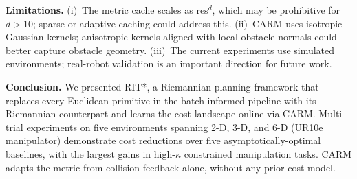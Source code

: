 \documentclass[journal]{IEEEtran}
\begin{document}
\textbf{Limitations.}
(i)~The metric cache scales as $\mathrm{res}^d$, which may be
prohibitive for $d > 10$; sparse or adaptive caching could address
this.
(ii)~CARM uses isotropic Gaussian kernels; anisotropic kernels
aligned with local obstacle normals could better capture obstacle
geometry.
(iii)~The current experiments use simulated environments; real-robot
validation is an important direction for future work.

\textbf{Conclusion.}
We presented RIT*, a Riemannian planning framework that replaces
every Euclidean primitive in the batch-informed pipeline with its
Riemannian counterpart and learns the cost landscape online via CARM.
Multi-trial experiments on five environments spanning 2-D, 3-D, and
6-D (UR10e manipulator) demonstrate cost reductions over five
asymptotically-optimal baselines, with the largest gains in
high-$\kappa$ constrained manipulation tasks.
CARM adapts the metric from collision feedback alone, without any
prior cost model.
\end{document}
